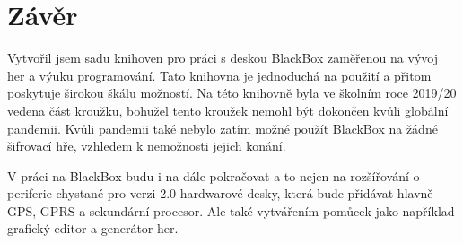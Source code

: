 \chapter{Závěr}

Vytvořil jsem sadu knihoven pro práci s deskou BlackBox zaměřenou na vývoj her a výuku programování.
Tato knihovna je jednoduchá na použití a přitom poskytuje širokou škálu možností.
Na této knihovně byla ve školním roce 2019/20 vedena část kroužku, bohužel tento kroužek nemohl být dokončen kvůli globální pandemii.
Kvůli pandemii také nebylo zatím možné použít BlackBox na žádné šifrovací hře, vzhledem k nemožnosti jejich konání.

V práci na BlackBox budu i na dále pokračovat a to nejen na rozšířování o periferie chystané pro verzi 2.0 hardwarové desky, která bude přidávat hlavně GPS, GPRS a sekundární procesor.
Ale také vytvářením pomůcek jako například grafický editor a generátor her.